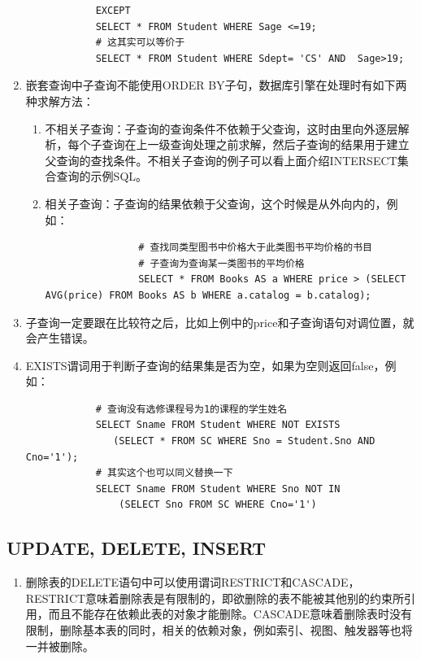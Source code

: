 \documentclass[main.tex]{subfiles}
\begin{document}
\begin{enumerate}
\begin{verbatim}
            EXCEPT
            SELECT * FROM Student WHERE Sage <=19;
            # 这其实可以等价于
            SELECT * FROM Student WHERE Sdept= 'CS' AND  Sage>19;
        \end{verbatim}
    \item 嵌套查询中子查询不能使用ORDER BY子句，数据库引擎在处理时有如下两种求解方法：
        \begin{enumerate}
            \item 不相关子查询：子查询的查询条件不依赖于父查询，这时由里向外逐层解析，每个子查询在上一级查询处理之前求解，然后子查询的结果用于建立父查询的查找条件。不相关子查询的例子可以看上面介绍INTERSECT集合查询的示例SQL。
            \item 相关子查询：子查询的结果依赖于父查询，这个时候是从外向内的，例如：
            \begin{verbatim}
                # 查找同类型图书中价格大于此类图书平均价格的书目
                # 子查询为查询某一类图书的平均价格
                SELECT * FROM Books AS a WHERE price > (SELECT AVG(price) FROM Books AS b WHERE a.catalog = b.catalog);
            \end{verbatim}
        \end{enumerate}
    \item 子查询一定要跟在比较符之后，比如上例中的price和子查询语句对调位置，就会产生错误。
    \item EXISTS谓词用于判断子查询的结果集是否为空，如果为空则返回false，例如：
        \begin{verbatim}
            # 查询没有选修课程号为1的课程的学生姓名
            SELECT Sname FROM Student WHERE NOT EXISTS
               (SELECT * FROM SC WHERE Sno = Student.Sno AND Cno='1');
            # 其实这个也可以同义替换一下
            SELECT Sname FROM Student WHERE Sno NOT IN
                (SELECT Sno FROM SC WHERE Cno='1')
        \end{verbatim}
\end{enumerate}

\subsection{UPDATE, DELETE, INSERT}
\begin{enumerate}
    \item 删除表的DELETE语句中可以使用谓词RESTRICT和CASCADE，RESTRICT意味着删除表是有限制的，即欲删除的表不能被其他别的约束所引用，而且不能存在依赖此表的对象才能删除。CASCADE意味着删除表时没有限制，删除基本表的同时，相关的依赖对象，例如索引、视图、触发器等也将一并被删除。
\end{enumerate}
\end{document}

